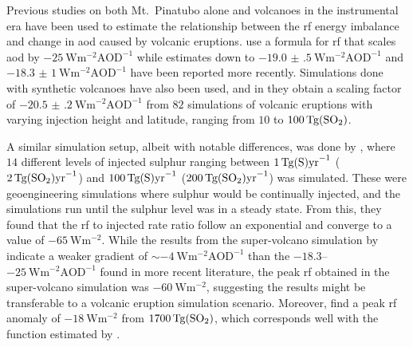 \documentclass{ametsocV6.1}
\begin{document}
Previous studies on both Mt.\ Pinatubo alone \citep{mills2017,hansen2005} and volcanoes
in the instrumental era \citep{gregory2016} have been used to estimate the relationship
between the \gls{rf} energy imbalance and change in \gls{aod} caused by volcanic
eruptions. \citet{myhre2013} use a formula for \gls{rf} that scales \gls{aod} by
\(\SI{-25}{\watt\metre^{-2}\mathrm{AOD}^{-1}}\) while estimates down to
\(\SI{-19.0(5)}{\watt\metre^{-2}\mathrm{AOD}^{-1}}\) \citep{gregory2016} and
\(\SI{-18.3(10)}{\watt\metre^{-2}\mathrm{AOD}^{-1}}\) \citep{mills2017} have been
reported more recently. Simulations done with synthetic volcanoes have also been used,
and in \citet{marshall2020} they obtain a scaling factor of
\(\SI{-20.5(2)}{\watt\metre^{-2}\mathrm{AOD}^{-1}}\) from \(82\) simulations of volcanic
eruptions with varying injection height and latitude, ranging from \(10\) to
\(\SI{100}{\tera\gram(\ce{SO2})}\).

A similar simulation setup, albeit with notable differences, was done by
\citet{niemeier2015}, where \(14\) different levels of injected sulphur ranging between
\(\SI{1}{\tera\gram(\ce{S})\mathrm{yr}^{-1}}\)
(\(\SI{2}{\tera\gram(\ce{SO2})\mathrm{yr}^{-1}}\)) and
\(\SI{100}{\tera\gram(\ce{S})\mathrm{yr}^{-1}}\)
(\(\SI{200}{\tera\gram(\ce{SO2})\mathrm{yr}^{-1}}\)) was simulated. These were
geoengineering simulations where sulphur would be continually injected, and the
simulations run until the sulphur level was in a steady state. From this, they found
that the \gls{rf} to injected  rate ratio follow an exponential and converge to
a value of \(\SI{-65}{\watt\metre^{-2}}\). While the results from the super-volcano
simulation by \citet{jones2005} indicate a weaker gradient of \(\sim
\SI{-4}{\watt\metre^{-2}\mathrm{AOD}^{-1}}\) than the
\(-18.3\)--\(\SI{-25}{\watt\metre^{-2}\mathrm{AOD}^{-1}}\) found in more recent
literature, the peak \gls{rf} obtained in the super-volcano simulation was
\(\SI{-60}{\watt\metre^{-2}}\), suggesting the \citet{niemeier2015} results might be
transferable to a volcanic eruption simulation scenario. Moreover, \citet{timmreck2010}
find a peak \gls{rf} anomaly of \(\SI{-18}{\watt\metre^{-2}}\) from
\(\SI{1700}{\tera\gram(\ce{SO2})}\), which corresponds well with the function estimated
by \citet{niemeier2015}.
\end{document}
